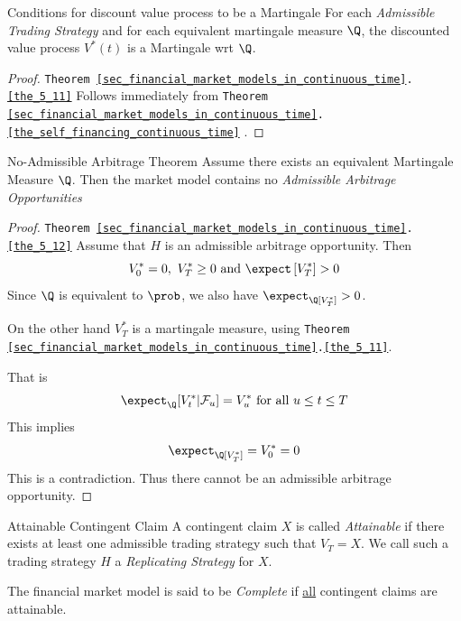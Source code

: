 \documentclass[11pt,a4paper]{article}
\begin{document}
  \begin{theorem}{Conditions for discount value process to be a Martingale}\label{the_5_11}
    For each \textit{Admissible Trading Strategy} and for each equivalent martingale measure $\Q$, the discounted value process $V^*(t)$ is a Martingale wrt $\Q$.
  \end{theorem}

  \begin{proof}{\texttt{Theorem \ref{sec_financial_market_models_in_continuous_time}.\ref{the_5_11}} }
    Follows immediately from \texttt{Theorem \ref{sec_financial_market_models_in_continuous_time}.\ref{the_self_financing_continuous_time}} .
  \end{proof}

  \begin{theorem}{No-Admissible Arbitrage Theorem}\label{the_5_12}
    Assume there exists an equivalent Martingale Measure $\Q$. Then the market model contains no \textit{Admissible Arbitrage Opportunities}
  \end{theorem}

  \begin{proof}{\texttt{Theorem \ref{sec_financial_market_models_in_continuous_time}.\ref{the_5_12}}}
    Assume that $H$ is an admissible arbitrage opportunity. Then
    \[ V_0^*=0,\ V_T^*\geq0\text{ and }\expect\left[V_T^*\right]>0 \]
    Since $\Q$ is equivalent to $\prob$, we also have $\expect_\Q[V_T^*]>0$.
    \par On the other hand $V_T^*$ is a martingale measure, using \texttt{Theorem \ref{sec_financial_market_models_in_continuous_time}.\ref{the_5_11}}.
    \par That is
    \[ \expect_\Q[V_t^*|\mathcal{F}_u]=V_u^*\text{ for all }u\leq t\leq T \]
    This implies
    \[ \expect_\Q[V_T^*]=V_0^*=0 \]
    This is a contradiction. Thus there cannot be an admissible arbitrage opportunity.\proved
  \end{proof}

  \begin{definition}{Attainable Contingent Claim}
    A contingent claim $X$ is called \textit{Attainable} if there exists at least one admissible trading strategy such that $V_T=X$. We call such a trading strategy $H$ a \textit{Replicating Strategy} for $X$.
    \par The financial market model is said to be \textit{Complete} if \underline{all} contingent claims are attainable.
  \end{definition}
\end{document}
